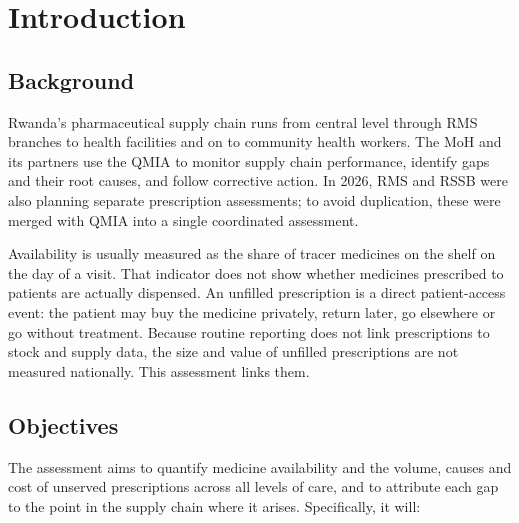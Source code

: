 \documentclass[10pt,a4paper]{report}
\begin{document}
\chapter{Introduction}
\section{Background}
Rwanda's pharmaceutical supply chain runs from central level through RMS branches to health facilities and on to community health workers. The MoH and its partners use the QMIA to monitor supply chain performance, identify gaps and their root causes, and follow corrective action. In 2026, RMS and RSSB were also planning separate prescription assessments; to avoid duplication, these were merged with QMIA into a single coordinated assessment.

Availability is usually measured as the share of tracer medicines on the shelf on the day of a visit. That indicator does not show whether medicines prescribed to patients are actually dispensed. An unfilled prescription is a direct patient-access event: the patient may buy the medicine privately, return later, go elsewhere or go without treatment. Because routine reporting does not link prescriptions to stock and supply data, the size and value of unfilled prescriptions are not measured nationally. This assessment links them.

\section{Objectives}
The assessment aims to quantify medicine availability and the volume, causes and cost of unserved prescriptions across all levels of care, and to attribute each gap to the point in the supply chain where it arises. Specifically, it will:
\end{document}
